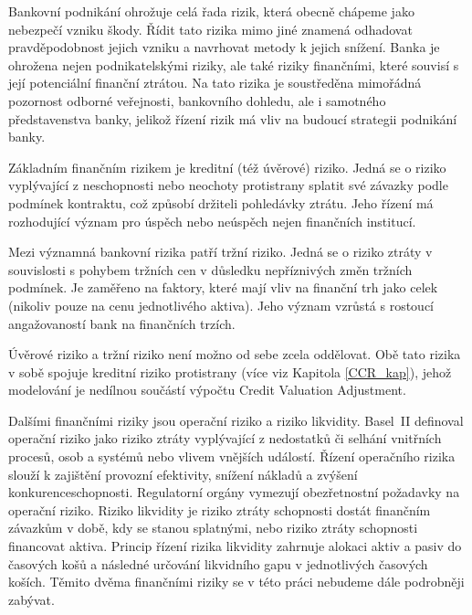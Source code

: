 \documentclass[a4paper,12pt]{report}
\theoremstyle{definition} \newtheorem{definice}[veta]{Definice}
\theoremstyle{remark}
\begin{document}
Bankovní podnikání ohrožuje celá řada rizik, která obecně chápeme jako nebezpečí vzniku škody. 
Řídit tato rizika mimo jiné znamená odhadovat pravděpodobnost jejich vzniku a navrhovat metody k jejich snížení.
Banka je ohrožena nejen podnikatelskými riziky, ale také riziky finančními, které souvisí s její potenciální finanční ztrátou. 
Na tato rizika je soustředěna mimořádná pozornost odborné veřejnosti, bankovního dohledu, ale i samotného představenstva banky, jelikož řízení rizik má vliv na budoucí strategii podnikání banky.

Základním finančním rizikem je kreditní (též úvěrové) riziko.
Jedná se o riziko vyplývající z neschopnosti nebo neochoty protistrany splatit své závazky podle podmínek
kontraktu, což způsobí držiteli pohledávky ztrátu.
Jeho řízení má rozhodující význam pro úspěch nebo neúspěch nejen finančních institucí. 

Mezi významná bankovní rizika patří tržní riziko. 
Jedná se o riziko ztráty v souvislosti s pohybem tržních cen v důsledku nepříznivých změn tržních podmínek. 
Je zaměřeno na faktory, které mají vliv na finanční trh jako celek (nikoliv pouze na cenu jednotlivého aktiva).
Jeho význam vzrůstá s rostoucí angažovaností bank na finančních trzích. 

Úvěrové riziko a tržní riziko není možno od sebe zcela oddělovat.
Obě tato rizika v sobě spojuje kreditní riziko protistrany (více viz Kapitola \ref{CCR_kap}), jehož modelování je nedílnou součástí výpočtu Credit Valuation Adjustment. 

Dalšími finančními riziky jsou operační riziko a riziko likvidity.
Basel~II %
definoval operační riziko jako riziko ztráty vyplývající z nedostatků či selhání vnitřních procesů, osob a systémů nebo vlivem vnějších událostí.
Řízení operačního rizika slouží k zajištění provozní efektivity, snížení nákladů a zvýšení konkurenceschopnosti.
Regulatorní orgány vymezují obezřetnostní požadavky na operační riziko.
Riziko likvidity je %
riziko ztráty schopnosti dostát finančním závazkům v době, kdy se stanou splatnými, nebo riziko ztráty schopnosti financovat aktiva.
Princip řízení rizika likvidity zahrnuje alokaci aktiv a pasiv do časových košů a následné určování likvidního gapu v jednotlivých časových koších. 
Těmito dvěma finančními riziky se v této práci nebudeme dále podrobněji zabývat.
\end{document}
